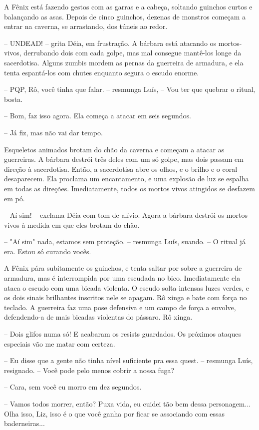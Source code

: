 A Fênix está fazendo gestos com as garras e a cabeça, soltando guinchos curtos e balançando as asas.
Depois de cinco guinchos, dezenas de monstros começam a entrar na caverna, se arrastando, dos túneis ao redor.

-- UNDEAD! -- grita Déia, em frustração. A bárbara está atacando os mortos-vivos, derrubando dois com cada golpe, 
mas mal consegue mantê-los longe da sacerdotisa. 
Alguns zumbis mordem as pernas da guerreira de armadura, e ela tenta espantá-los com chutes enquanto segura o escudo enorme.

-- PQP, Rô, você tinha que falar. -- resmunga Luís, -- Vou ter que quebrar o ritual, bosta.

-- Bom, faz isso agora. Ela começa a atacar em seis segundos.

-- Já fiz, mas não vai dar tempo.

Esqueletos animados brotam do chão da caverna e começam a atacar as guerreiras. A bárbara destrói três deles com um só golpe,
mas dois passam em direção à sacerdotisa. 
Então, a sacerdotisa abre os olhos, e o brilho e o coral
desaparecem. Ela proclama um encantamento, e uma explosão de luz se espalha em todas as direções. Imediatamente,
todos os mortos vivos atingidos se desfazem em pó.

-- Aí sim! -- exclama Déia com tom de alívio. Agora a bárbara destrói os mortos-vivos à medida em que eles brotam do chão.

-- "Aí sim" nada, estamos sem proteção. -- resmunga Luís, suando. -- O ritual já era. Estou só curando vocês.

A Fênix pára subitamente os guinchos, e tenta saltar por sobre a guerreira de armadura, mas é interrompida por uma escudada no bico.
Imediatamente ela ataca o escudo com uma bicada violenta. O escudo solta intensas luzes verdes, e os dois sinais
brilhantes inscritos nele se apagam. Rô xinga e bate com força no teclado. A guerreira faz uma pose defensiva e um campo de força a envolve,
defendendo-a de mais bicadas violentas do pássaro. Rô xinga.

-- Dois glifos numa só! E acabaram os resists guardados. Os próximos ataques especiais vão me matar com certeza.

-- Eu disse que a gente não tinha nível suficiente pra essa quest. -- resmunga Luís, resignado. -- Você pode pelo menos cobrir a nossa fuga?

-- Cara, sem você eu morro em dez segundos.

-- Vamos todos morrer, então? Puxa vida, eu cuidei tão bem dessa personagem... Olha isso, Liz, isso é o que você ganha por ficar se associando
com essas baderneiras...


